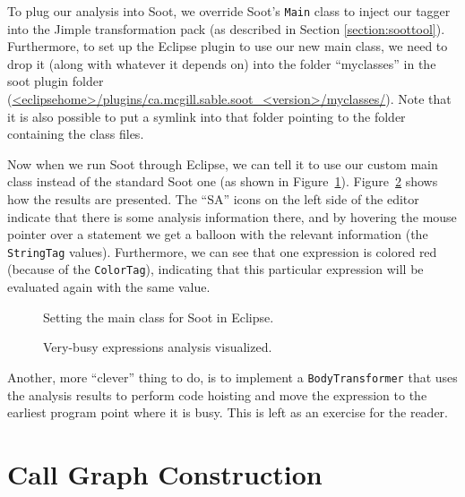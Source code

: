 \documentclass{article}
\newcommand{\code}[1]{\texttt{\small #1}}
\begin{document}
To plug our analysis into Soot, we override Soot's \code{Main} class
to inject our tagger into the Jimple transformation pack (as described
in Section \ref{section:soottool}). Furthermore, to set up the Eclipse
plugin to use our new main class, we need to drop it (along with
whatever it depends on) into the folder ``myclasses'' in the soot
plugin folder
(\url{<eclipsehome>/plugins/ca.mcgill.sable.soot_<version>/myclasses/}).
Note that it is also possible to put a symlink into that folder
pointing to the folder containing the class files.

Now when we run Soot through Eclipse, we can tell it to use our custom
main class instead of the standard Soot one (as shown in
Figure~\ref{fig:settingmain}). Figure~\ref{fig:vberun} shows how the
results are presented. The ``SA'' icons on the left side of the editor
indicate that there is some analysis information there, and by
hovering the mouse pointer over a statement we get a balloon with the
relevant information (the \code{StringTag} values). Furthermore, we
can see that one expression is colored red (because of the
\code{ColorTag}), indicating that this particular expression will be
evaluated again with the same value.

\begin{figure}[!htb]
  \centering
  \caption{Setting the main class for Soot in Eclipse.}
  \label{fig:settingmain}
\end{figure}

\begin{figure}[!htb]
  \centering
  \caption{Very-busy expressions analysis visualized.}
  \label{fig:vberun}
\end{figure}

Another, more ``clever'' thing to do, is to implement a
\code{BodyTransformer} that uses the analysis results to perform code
hoisting and move the expression to the earliest program point where
it is busy. This is left as an exercise for the reader.

\section{Call Graph Construction}
\label{sec:call:graph:construction}
\end{document}
